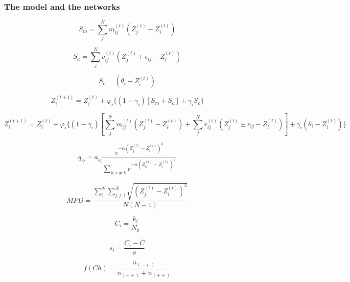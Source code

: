 \documentclass[a4paper, 12pt]{article}
\begin{document}
\subsubsection*{The model and the networks}
\cite{abrams_classifying_1987}

\begin{equation} \label{eq:1}
	S_{m} = \sum^{N}_{j} m^{(t)}_{ij}(Z^{(t)}_{j} - Z^{(t)}_{i})
\end{equation}

\begin{equation} \label{eq:2}
  S_{a} = \sum^{N}_{j}v^{(t)}_{ij}(Z^{(t)}_{j} \pm \epsilon_{ij} - Z^{(t)}_{i})
\end{equation}

\begin{equation} \label{eq:3}
  S_{e} = (\theta_{i} - Z^{(t)}_{i})
\end{equation}

\begin{equation} \label{eq:4}
  Z^{(t+1)}_{i} = Z^{(t)}_{i} + \varphi_{i}\{(1 - \gamma_{i})[S_{m} + S_{a}] + \gamma_{i}S_{e}\}
\end{equation}

\begin{equation} \label{eq:5}
  Z^{(t+1)}_{i} = Z^{(t)}_{i} + \varphi_{i}\{(1 - \gamma_{i})[\sum^{N}_{j} m^{(t)}_{ij}(Z^{(t)}_{j} - Z^{(t)}_{i}) + \sum^{N}_{j}v^{(t)}_{ij}(Z^{(t)}_{j} \pm \epsilon_{ij} - Z^{(t)}_{i})] + \gamma_{i}(\theta_{i} - Z^{(t)}_{i})\}
\end{equation}

\begin{equation} \label{eq:6}
  q_{ij} = a_{ij} \frac{e^{-\alpha(Z^{(t)}_{j} - Z^{(t)}_{i})^2}}{\sum_{k, i \neq k} e^{-\alpha(Z^{(t)}_{k} - Z^{(t)}_{i})^2} }
\end{equation}

\begin{equation} \label{eq:7}
MPD = \frac{\sum^{N}_{i}\sum^{N}_{j \neq i} \sqrt{(Z^{(t)}_{j} - Z^{(t)}_{i})^2}}{N(N-1)}  
\end{equation}

\begin{equation} \label{eq:8}
  C_{i} = \frac{k_{i}} {N_{0}}
\end{equation}

\begin{equation} \label{eq:9}
  s_{i} = \frac{C_{i} - \overline{C}}{\sigma}
\end{equation}

\begin{equation} \label{eq:10}
  f(Ch) = \frac{n_{(-+)}}{n_{(-+)} + n_{(++)}}
\end{equation}
\end{document}
